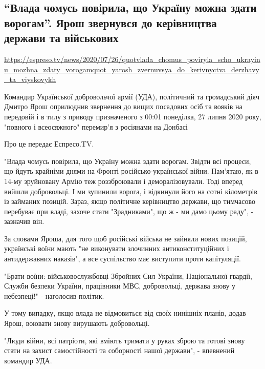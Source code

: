  
 
  
\subsection{``Влада чомусь повірила, що Україну можна здати ворогам''. Ярош звернувся до керівництва держави та військових}
\url{https://espreso.tv/news/2020/07/26/quotvlada_chomus_poviryla_scho_ukrayinu_mozhna_zdaty_vorogamquot_yarosh_zvernuvsya_do_kerivnyctva_derzhavy_ta_viyskovykh}

  
Командир Української добровольчої армії (УДА), політичний та громадський діяч
Дмитро Ярош оприлюднив звернення до вищих посадових осіб та вояків на передовій
і в тилу з приводу призначеного з 00:01 понеділка, 27 липня 2020 року, "повного
і всеосяжного" перемир’я з росіянами на Донбасі 

Про це передає Еспресо.TV.

"Влада чомусь повірила, що Україну можна здати ворогам. Звідти всі процеси, що
йдуть крайніми днями на Фронті російсько-української війни. Пам’ятаю, як в
14-му зруйновану Армію теж роззброювали і деморалізовували. Тоді вперед вийшли
добровольці. І ми зупинили ворога, і відкинули його на сотні кілометрів із
займаних позицій. Зараз, якщо політичне керівництво держави, що тимчасово
перебуває при владі, захоче стати "Зрадниками", що ж - ми дамо цьому раду", -
зазначив він.

За словами Яроша, для того щоб російські війська не зайняли нових позицій,
українські воїни мають "не виконувати злочинних антиконституційних і
антидержавних наказів", а все суспільство має виступити проти капітуляції.

"Брати-воїни: військовослужбовці Збройних Сил України, Національної гвардії,
Служби безпеки України, працівники МВС, добровольці, держава знову у
небезпеці!" - наголосив політик.

У тому випадку, якщо влада не відмовиться від своїх нинішніх планів, додав
Ярош, воювати знову вирушають добровольці.

"Люди війни, всі патріоти, які вміють тримати у руках зброю та готові знову
стати на захист самостійності та соборності нашої держави", - впевнений
командир УДА.

